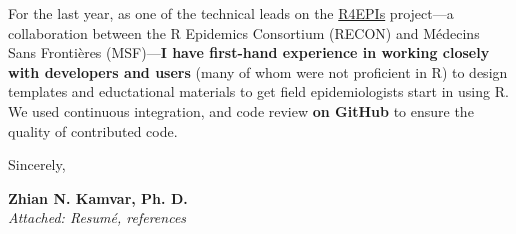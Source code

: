\vspace{1ex}

For the last year, as one of the technical leads on the
\href{https://r4epis.netlify.com}{R4EPIs} project---a collaboration between the
R Epidemics Consortium (RECON) and M\'{e}decins Sans Fronti\`{e}res (MSF)---\textbf{I
have first-hand experience in working closely with developers and users} (many
of whom were not proficient in R) to design templates and eductational materials
to get field epidemiologists start in using R. We used continuous integration,
and code review \textbf{on GitHub} to ensure the quality of contributed code.



\vspace{2ex}

Sincerely,

\vspace{5ex}

\textbf{Zhian N. Kamvar, Ph. D.}\\
\textit{Attached: Resum\'{e}, references}













\clearpage
